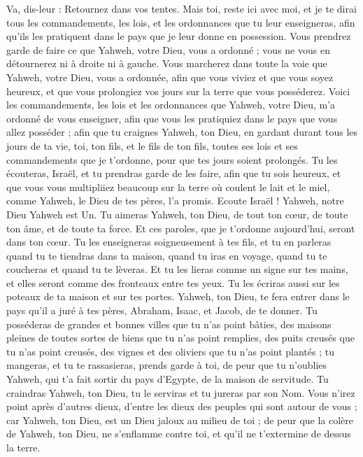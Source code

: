 \begin{multicols}{2}
Va, dis-leur : Retournez dans vos tentes.
Mais toi, reste ici avec moi, et je te dirai tous les commandements, les lois, et les ordonnances que tu leur enseigneras, afin qu'ils les pratiquent dans le pays que je leur donne en possession.
Vous prendrez garde de faire ce que Yahweh, votre Dieu, vous a ordonné ; vous ne vous en détournerez ni à droite ni à gauche.
Vous marcherez dans toute la voie que Yahweh, votre Dieu, vous a ordonnée, afin que vous viviez et que vous soyez heureux, et que vous prolongiez vos jours sur la terre que vous posséderez.
\VerseOne{}Voici les commandements, les lois et les ordonnances que Yahweh, votre Dieu, m'a ordonné de vous enseigner, afin que vous les pratiquiez dans le pays que vous allez posséder ;
afin que tu craignes Yahweh, ton Dieu, en gardant durant tous les jours de ta vie, toi, ton fils, et le fils de ton fils, toutes ses lois et ses commandements que je t’ordonne, pour que tes jours soient prolongés.
Tu les écouteras, Israël, et tu prendras garde de les faire, afin que tu sois heureux, et que vous vous multipliiez beaucoup sur la terre où coulent le lait et le miel, comme Yahweh, le Dieu de tes pères, l'a promis.
Ecoute Israël ! Yahweh, notre Dieu Yahweh est Un\FTNT{}.
Tu aimeras Yahweh, ton Dieu, de tout ton cœur, de toute ton âme, et de toute ta force.
Et ces paroles, que je t’ordonne aujourd'hui, seront dans ton cœur.
Tu les enseigneras soigneusement à tes fils, et tu en parleras quand tu te tiendras dans ta maison, quand tu iras en voyage, quand tu te coucheras et quand tu te lèveras.
Et tu les lieras comme un signe sur tes mains, et elles seront comme des fronteaux entre tes yeux.
Tu les écriras aussi sur les poteaux de ta maison et sur tes portes.
Yahweh, ton Dieu, te fera entrer dans le pays qu'il a juré à tes pères, Abraham, Isaac, et Jacob, de te donner. Tu posséderas de grandes et bonnes villes que tu n'as point bâties,
des maisons pleines de toutes sortes de biens que tu n'as point remplies, des puits creusés que tu n'as point creusés, des vignes et des oliviers que tu n'as point plantés ; tu mangeras, et tu te rassasieras,
prends garde à toi, de peur que tu n'oublies Yahweh, qui t'a fait sortir du pays d'Egypte, de la maison de servitude.
Tu craindras Yahweh, ton Dieu, tu le serviras et tu jureras par son Nom.
Vous n’irez point après d’autres dieux, d'entre les dieux des peuples qui sont autour de vous ;
car Yahweh, ton Dieu, est un Dieu jaloux au milieu de toi ; de peur que la colère de Yahweh, ton Dieu, ne s'enflamme contre toi, et qu'il ne t'extermine de dessus la terre.

\end{multicols}
